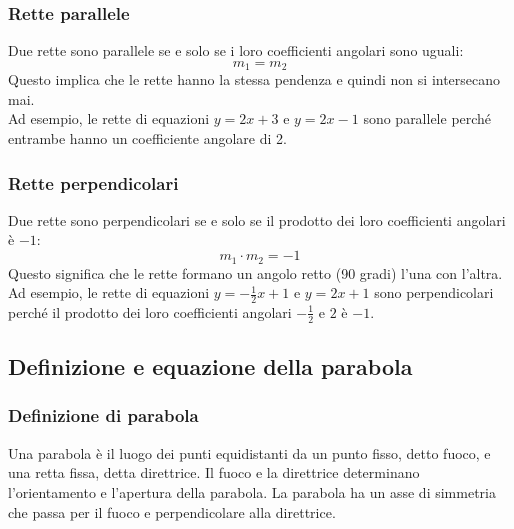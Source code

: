 \documentclass{article}
\begin{document}
\newpage
\subsubsection{Rette parallele}
Due rette sono parallele se e solo se i loro coefficienti angolari sono uguali:
\[
    m_1 = m_2
\]
Questo implica che le rette hanno la stessa pendenza e quindi non si intersecano mai.\\
Ad esempio, le rette di equazioni \(y = 2x + 3\) e \(y = 2x - 1\) sono parallele perché
entrambe hanno un coefficiente angolare di 2.


\newpage
\subsubsection{Rette perpendicolari}
Due rette sono perpendicolari se e solo se il prodotto dei loro coefficienti angolari è \(-1\):
\[
    m_1 \cdot m_2 = -1
\]
Questo significa che le rette formano un angolo retto (90 gradi) l'una con l'altra. Ad esempio,
le rette di equazioni \(y = -\frac{1}{2}x + 1\) e \(y = 2x + 1\) sono perpendicolari perché il
prodotto dei loro coefficienti angolari \(-\frac{1}{2}\) e \(2\) è \(-1\).


\newpage
\subsection{Definizione e equazione della parabola}

\subsubsection{Definizione di parabola}
Una parabola è il luogo dei punti equidistanti da un punto fisso, detto fuoco, e una retta
fissa, detta direttrice. Il fuoco e la direttrice determinano l'orientamento e l'apertura
della parabola. La parabola ha un asse di simmetria che passa per il fuoco e perpendicolare
alla direttrice.
\end{document}
